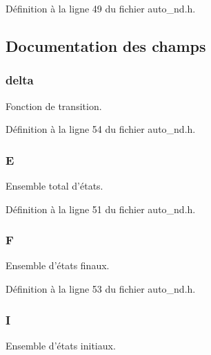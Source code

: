 \-Définition à la ligne 49 du fichier auto\-\_\-nd.\-h.



\subsection{\-Documentation des champs}
\hypertarget{struct_automate___n_d_ab0a6aaf56ad2b80412c18ed3b18db517}{
\subsubsection[{delta}]{ {\bf delta}}}\label{struct_automate___n_d_ab0a6aaf56ad2b80412c18ed3b18db517}
\-Fonction de transition. 

\-Définition à la ligne 54 du fichier auto\-\_\-nd.\-h.

\hypertarget{struct_automate___n_d_aaf06b1de553b579c708e8d3a72252ff8}{
\subsubsection[{\-E}]{ {\bf \-E}}}\label{struct_automate___n_d_aaf06b1de553b579c708e8d3a72252ff8}
\-Ensemble total d'états. 

\-Définition à la ligne 51 du fichier auto\-\_\-nd.\-h.

\hypertarget{struct_automate___n_d_af21e5b6b3c70a14bc833c833e1c3c1e1}{
\subsubsection[{\-F}]{ {\bf \-F}}}\label{struct_automate___n_d_af21e5b6b3c70a14bc833c833e1c3c1e1}
\-Ensemble d'états finaux. 

\-Définition à la ligne 53 du fichier auto\-\_\-nd.\-h.

\hypertarget{struct_automate___n_d_ab814f5651b88a864f155f6fe428806b6}{
\subsubsection[{\-I}]{ {\bf \-I}}}\label{struct_automate___n_d_ab814f5651b88a864f155f6fe428806b6}
\-Ensemble d'états initiaux. 

